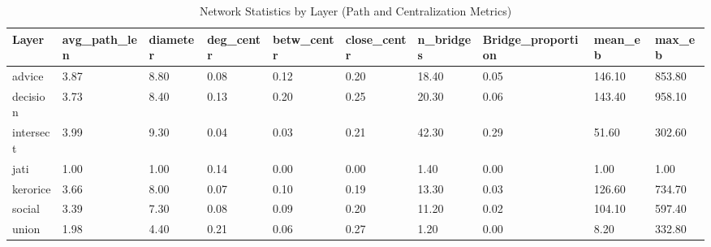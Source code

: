 \begin{table}
\centering
\caption{Network Statistics by Layer (Path and Centralization Metrics)}
\centering
\begin{tabular}[t]{llllllllll}
\toprule
Layer & avg\_path\_len & diameter & deg\_centr & betw\_centr & close\_centr & n\_bridges & Bridge\_proportion & mean\_eb & max\_eb\\
\midrule
advice & 3.87 & 8.80 & 0.08 & 0.12 & 0.20 & 18.40 & 0.05 & 146.10 & 853.80\\
decision & 3.73 & 8.40 & 0.13 & 0.20 & 0.25 & 20.30 & 0.06 & 143.40 & 958.10\\
intersect & 3.99 & 9.30 & 0.04 & 0.03 & 0.21 & 42.30 & 0.29 & 51.60 & 302.60\\
jati & 1.00 & 1.00 & 0.14 & 0.00 & 0.00 & 1.40 & 0.00 & 1.00 & 1.00\\
kerorice & 3.66 & 8.00 & 0.07 & 0.10 & 0.19 & 13.30 & 0.03 & 126.60 & 734.70\\
social & 3.39 & 7.30 & 0.08 & 0.09 & 0.20 & 11.20 & 0.02 & 104.10 & 597.40\\
union & 1.98 & 4.40 & 0.21 & 0.06 & 0.27 & 1.20 & 0.00 & 8.20 & 332.80\\
\bottomrule
\end{tabular}
\end{table}
